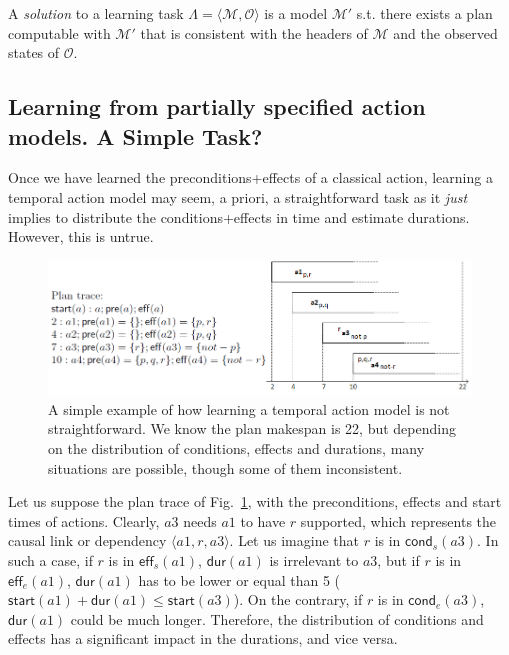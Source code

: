\documentclass[runningheads]{llncs}
\newcommand{\tup}[1]{{\langle #1 \rangle}}
\newcommand{\pre}{\mathsf{pre}}    %
\newcommand{\eff}{\mathsf{eff}}    %
\newcommand{\cond}{\mathsf{cond}}  %
\newcommand{\dur}{\mathsf{dur}}    %
\newcommand{\start}{\mathsf{start}}%
\begin{document}
A {\em solution} to a learning task $\Lambda=\tup{\mathcal{M},{\mathcal O}}$ is a model $\mathcal{M}'$ s.t. there exists a plan computable with $\mathcal{M}'$ that is consistent with the headers of $\mathcal{M}$ and the observed states of $\mathcal{O}$. 



\subsection{Learning from partially specified action models. A Simple Task?}

Once we have learned the preconditions+effects of a classical action, learning a temporal action model may seem, a priori, a straightforward task as it \emph{just} implies to distribute the conditions+effects in time and estimate durations. However, this is untrue.

\begin{figure}


\center \includegraphics[width=12cm]{ejemploacciones2.png}
\caption{A simple example of how learning a temporal action model is not straightforward. We know the plan makespan is 22, but depending on the distribution of conditions, effects and durations, many situations are possible, though some of them inconsistent.}
\label{fig:exampleplantrace}
\end{figure}


Let us suppose the plan trace of Fig.~\ref{fig:exampleplantrace}, with the preconditions, effects and start times of actions. Clearly, $a3$ needs $a1$ to have $r$ supported, which represents the causal link or dependency $\tup{a1,r,a3}$. Let us imagine that $r$ is in $\cond_s(a3)$. In such a case, if $r$ is in $\eff_s(a1)$, $\dur(a1)$ is irrelevant to $a3$, but if $r$ is in $\eff_e(a1)$, $\dur(a1)$ has to be lower or equal than 5 ($\start(a1)+\dur(a1) \leq \start(a3)$). On the contrary, if $r$ is in $\cond_e(a3)$, $\dur(a1)$ could be much longer. Therefore, the distribution of conditions and effects has a significant impact in the durations, and vice versa.
\end{document}
